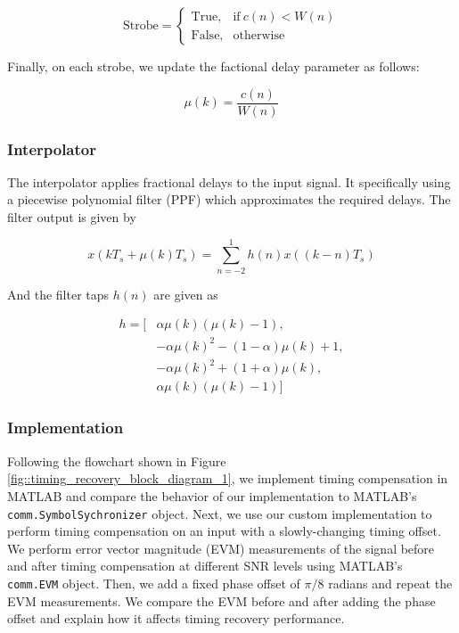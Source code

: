 \documentclass{article}
\begin{document}
\begin{equation}
	\text{Strobe} = \begin{cases}
		\text{True}, & \text{if}\ c(n) < W(n)\\
		\text{False}, & \text{otherwise}
	\end{cases}
\end{equation}

\noindent Finally, on each strobe, we update the factional delay parameter as follows:

\begin{equation}
	\mu(k) = \frac{c(n)}{W(n)}
\end{equation}

\subsubsection{Interpolator}

The interpolator applies fractional delays to the input signal. It specifically using a piecewise polynomial filter (PPF) which approximates the required delays. The filter output is given by

\begin{equation}
	x(kT_s + \mu(k)T_s) = \sum_{n=-2}^{1}{h(n)x((k-n)T_s)}
\end{equation}

\noindent And the filter taps $h(n)$ are given as

\begin{equation}
\begin{split}
	h = [&\alpha\mu(k)(\mu(k) - 1), \\
	&-\alpha\mu(k)^2 - (1-\alpha)\mu(k) + 1,\\
	&-\alpha\mu(k)^2 + (1+\alpha)\mu(k),\\
	&\alpha\mu(k)(\mu(k) - 1)]
\end{split}
\end{equation}

\subsubsection{Implementation}

Following the flowchart shown in Figure \ref{fig::timing_recovery_block_diagram_1}, we implement timing compensation in MATLAB and compare the behavior of our implementation to MATLAB's \texttt{comm.SymbolSychronizer} object. Next, we use our custom implementation to perform timing compensation on an input with a slowly-changing timing offset. We perform error vector magnitude (EVM) measurements of the signal before and after timing compensation at different SNR levels using MATLAB's \texttt{comm.EVM} object. Then, we add a fixed phase offset of $\pi/8$ radians and repeat the EVM measurements. We compare the EVM before and after adding the phase offset and explain how it affects timing recovery performance.
\end{document}
